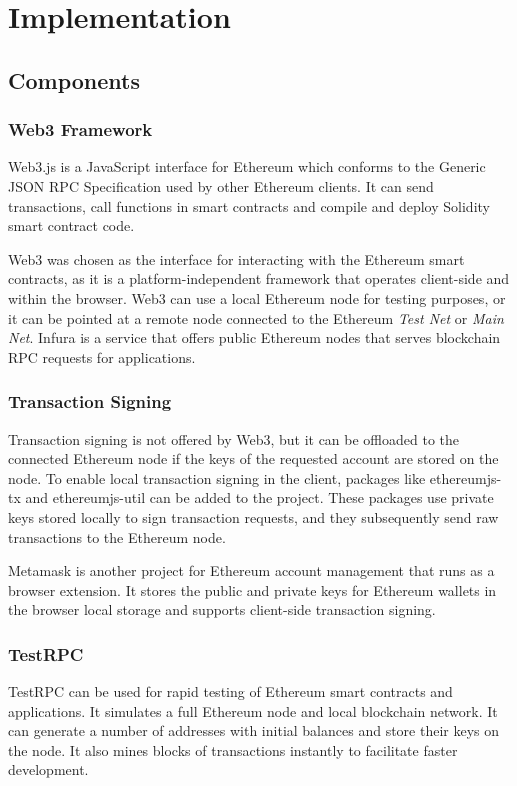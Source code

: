 \chapter{Implementation}
\label{chp:implementation}
\section{Components}
\subsection{Web3 Framework}
Web3.js \cite{ethereum_foundation_web3.js_nodate} is a JavaScript interface for Ethereum which conforms to the Generic \ac{JSON} \ac{RPC} Specification \cite{ethereum_foundation_ethereum_nodate} used by other Ethereum clients. It can send transactions, call functions in smart contracts and compile and deploy Solidity smart contract code.

Web3 was chosen as the interface for interacting with the Ethereum smart contracts, as it is a platform-independent framework that operates client-side and within the browser. Web3 can use a local Ethereum node for testing purposes, or it can be pointed at a remote node connected to the Ethereum \textit{Test Net} or \textit{Main Net}. Infura \cite{noauthor_infura_nodate} is a service that offers public Ethereum nodes that serves blockchain \ac{RPC} requests for applications.

\subsection{Transaction Signing}
Transaction signing is not offered by Web3, but it can be offloaded to the connected Ethereum node if the keys of the requested account are stored on the node. To enable local transaction signing in the client, packages like ethereumjs-tx \cite{noauthor_ethereumjs-tx_nodate} and ethereumjs-util \cite{noauthor_ethereumjs-util_nodate} can be added to the project. These packages use private keys stored locally to sign transaction requests, and they subsequently send raw transactions to the Ethereum node.

Metamask \cite{noauthor_metamask_nodate} is another project for Ethereum account management that runs as a browser extension. It stores the public and private keys for Ethereum wallets in the browser local storage and supports client-side transaction signing.

\subsection{TestRPC}
TestRPC \cite{noauthor_testrpc_nodate} can be used for rapid testing of Ethereum smart contracts and applications. It simulates a full Ethereum node and local blockchain network. It can generate a number of addresses with initial balances and store their keys on the node. It also mines blocks of transactions instantly to facilitate faster development.

